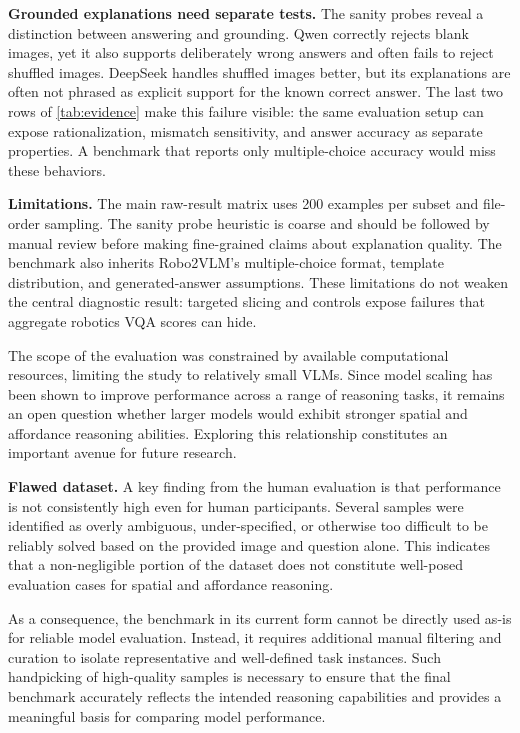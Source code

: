 \textbf{Grounded explanations need separate tests.}
The sanity probes reveal a distinction between answering and grounding. Qwen correctly rejects blank images, yet it also supports deliberately wrong answers and often fails to reject shuffled images. DeepSeek handles shuffled images better, but its explanations are often not phrased as explicit support for the known correct answer. The last two rows of \cref{tab:evidence} make this failure visible: the same evaluation setup can expose rationalization, mismatch sensitivity, and answer accuracy as separate properties. A benchmark that reports only multiple-choice accuracy would miss these behaviors.

\textbf{Limitations.}
The main raw-result matrix uses 200 examples per subset and file-order sampling. The sanity probe heuristic is coarse and should be followed by manual review before making fine-grained claims about explanation quality. The benchmark also inherits Robo2VLM's multiple-choice format, template distribution, and generated-answer assumptions. These limitations do not weaken the central diagnostic result: targeted slicing and controls expose failures that aggregate robotics VQA scores can hide.

The scope of the evaluation was constrained by available computational resources, limiting the study to relatively small VLMs. Since model scaling has been shown to improve performance across a range of reasoning tasks, it remains an open question whether larger models would exhibit stronger spatial and affordance reasoning abilities. Exploring this relationship constitutes an important avenue for future research.

\textbf{Flawed dataset.}
A key finding from the human evaluation is that performance is not consistently high even for human participants. Several samples were identified as overly ambiguous, under-specified, or otherwise too difficult to be reliably solved based on the provided image and question alone. This indicates that a non-negligible portion of the dataset does not constitute well-posed evaluation cases for spatial and affordance reasoning.

As a consequence, the benchmark in its current form cannot be directly used as-is for reliable model evaluation. Instead, it requires additional manual filtering and curation to isolate representative and well-defined task instances. Such handpicking of high-quality samples is necessary to ensure that the final benchmark accurately reflects the intended reasoning capabilities and provides a meaningful basis for comparing model performance.

